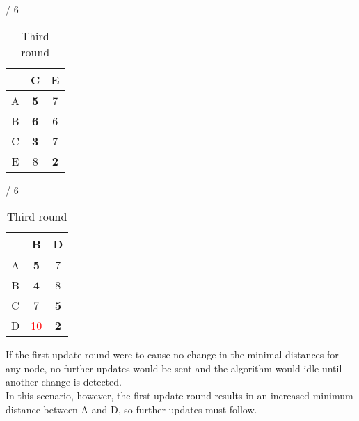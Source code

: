 \documentclass[a4paper, 11 pt, article, accentcolor=tud7b]{tudreport}
\begin{document}
\begin{table}[h]
\begin{subtable}[b]{\textwidth / 6}
\begin{tabular}{| c | c | c |}
	    \hline
	      & C                  & E                  \\ \hline
	    A & \textbf{5}         & 7                  \\ \hline
	    B & \textbf{6}         & 6                  \\ \hline
	    C & \textbf{3}         & 7                  \\ \hline
	    E & 8                  & \textbf{2}         \\ \hline
	    \end{tabular}
	    \caption{$D^{D}$}
	  \end{subtable}
	  \hfill
	  \begin{subtable}[b]{\textwidth / 6}
	    \begin{tabular}{| c | c | c |}
	    \hline
	      & B                   & D                    \\ \hline
	    A & \textbf{5}          & 7                    \\ \hline
	    B & \textbf{4}          & 8                    \\ \hline
	    C & 7                   & \textbf{5}           \\ \hline
	    D & \textcolor{red}{10} & \textbf{2}           \\ \hline
	    \end{tabular}
	    \caption{$D^{E}$}
	  \end{subtable}
	  \caption{Third round}
	\end{table}
	
	If the first update round were to cause no change in the minimal distances for any node, no further updates would be sent and the algorithm would idle until another change is detected. \\
	In this scenario, however, the first update round results in an increased minimum distance between A and D, so further updates must follow.
	
\end{document}
